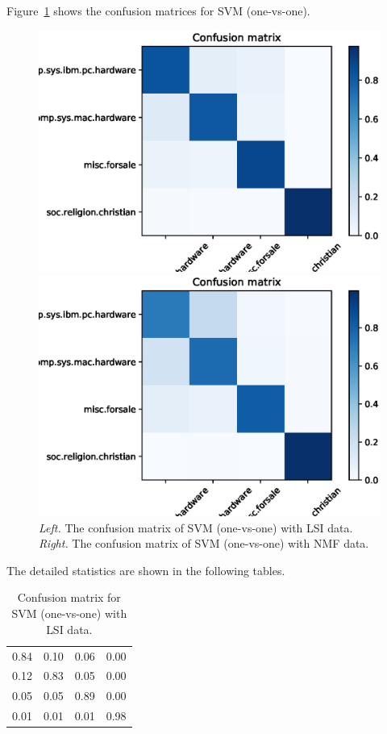 \documentclass[letterpaper]{article}
\begin{document}
Figure~\ref{fig:svm-one-2} shows the confusion matrices for SVM
(one-vs-one).
\begin{figure}[!htb]
\centering
\begin{minipage}{0.5\textwidth}
\includegraphics[width=1.0\textwidth]{conf-mat-lsi-svm-one}
\end{minipage}%
\begin{minipage}{0.5\textwidth}
\includegraphics[width=1.0\textwidth]{conf-mat-nmf-svm-one}
\end{minipage}
\caption{\emph{Left.} The confusion matrix of SVM (one-vs-one)
with LSI data.
\emph{Right.} The confusion matrix of SVM (one-vs-one) with NMF data.}
\label{fig:svm-one-2}
\end{figure}

The detailed statistics are shown in the following tables.
\begin{table}[H]
\centering
\begin{tabular}{cccc}
0.84 & 0.10 & 0.06 & 0.00 \\
0.12 & 0.83 & 0.05 & 0.00 \\
0.05 & 0.05 & 0.89 & 0.00 \\
0.01 & 0.01 & 0.01 & 0.98
\end{tabular}
\caption{Confusion matrix for SVM (one-vs-one) with LSI data.}
\end{table}
\end{document}

